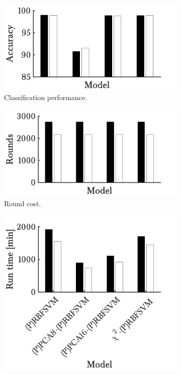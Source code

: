 \begin{figure}[h!]
        \begin{subfigure}[b]{.49\textwidth}  
            \centering 
            \includegraphics[width=.98\textwidth]{parts/chap-4/img-svm/rbfsvm-timing/acc.png}
            \caption{Classification performance.} 
        \end{subfigure}
        \hfill
        \begin{subfigure}[b]{.49\textwidth}   
            \centering 
            \includegraphics[width=.98\textwidth]{parts/chap-4/img-svm/rbfsvm-timing/rounds.png}
            \caption{Round cost.} 
        \end{subfigure}
        \hfill
        \begin{subfigure}[b]{.49\textwidth}   
            \centering 
            \includegraphics[width=.98\textwidth]{parts/chap-4/img-svm/rbfsvm-timing/time.png}

\end{subfigure}
\end{figure}
